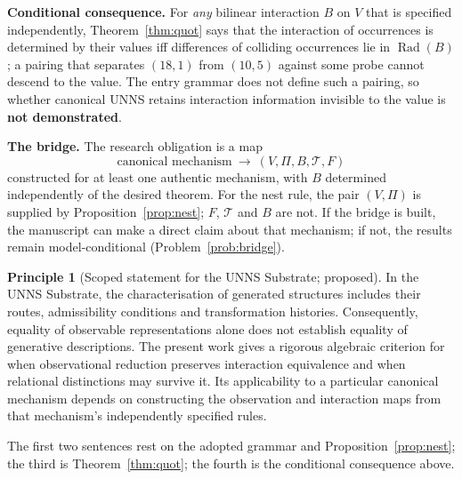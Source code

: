 \documentclass[11pt,a4paper]{article}
\newcommand{\Rad}{\operatorname{Rad}}
\theoremstyle{plain}
\theoremstyle{definition}
\newtheorem{principle}[theorem]{Principle}
\begin{document}
\par\smallskip\noindent\textbf{Conditional consequence.} For \emph{any} bilinear interaction $B$ on $V$ that is specified independently, Theorem~\ref{thm:quot} says that the interaction of occurrences is determined by their values iff differences of colliding occurrences lie in $\Rad(B)$; a pairing that separates $(18,1)$ from $(10,5)$ against some probe cannot descend to the value. The entry grammar does not define such a pairing, so whether canonical UNNS retains interaction information invisible to the value is \textbf{not demonstrated}.
\par\smallskip\noindent\textbf{The bridge.} The research obligation is a map
\[\boxed{\text{canonical mechanism}\ \longrightarrow\ (V,\Pi,B,\mathcal T,F)}\]
constructed for at least one authentic mechanism, with $B$ determined independently of the desired theorem. For the nest rule, the pair $(V,\Pi)$ is supplied by Proposition~\ref{prop:nest}; $F$, $\mathcal T$ and $B$ are not. If the bridge is built, the manuscript can make a direct claim about that mechanism; if not, the results remain model-conditional (Problem~\ref{prob:bridge}).
\begin{principle}[Scoped statement for the UNNS Substrate; proposed]\label{princ:scoped}
In the UNNS Substrate, the characterisation of generated structures includes their routes, admissibility conditions and transformation histories. Consequently, equality of observable representations alone does not establish equality of generative descriptions. The present work gives a rigorous algebraic criterion for when observational reduction preserves interaction equivalence and when relational distinctions may survive it. Its applicability to a particular canonical mechanism depends on constructing the observation and interaction maps from that mechanism's independently specified rules.
\end{principle}
The first two sentences rest on the adopted grammar and Proposition~\ref{prop:nest}; the third is Theorem~\ref{thm:quot}; the fourth is the conditional consequence above.
\end{document}
